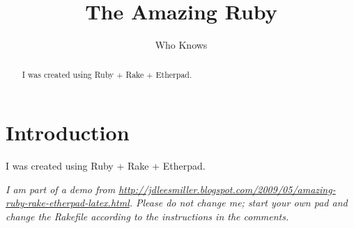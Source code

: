 \documentclass[english]{article}
\begin{document}
\title{The Amazing Ruby}

\author{Who Knows}

\maketitle

\begin{abstract}
I was created using Ruby + Rake + Etherpad.
\end{abstract}

\section{Introduction}
\label{sec:intro}

I was created using Ruby + Rake + Etherpad.

\em{I am part of a demo from \url{http://jdleesmiller.blogspot.com/2009/05/amazing-ruby-rake-etherpad-latex.html}. Please do not change me; start your own pad and change the Rakefile according to the instructions in the comments.}
\end{document}

